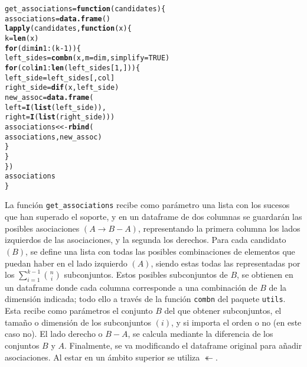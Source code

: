 \documentclass[12pt]{report}\usepackage[]{graphicx}\usepackage[dvipsnames]{xcolor}
\makeatletter
\newcommand{\hlnum}[1]{\textcolor[rgb]{0.686,0.059,0.569}{#1}}%
\newcommand{\hlopt}[1]{\textcolor[rgb]{0,0,0}{#1}}%
\newcommand{\hlstd}[1]{\textcolor[rgb]{0.345,0.345,0.345}{#1}}%
\newcommand{\hlkwa}[1]{\textcolor[rgb]{0.161,0.373,0.58}{\textbf{#1}}}%
\newcommand{\hlkwb}[1]{\textcolor[rgb]{0.69,0.353,0.396}{#1}}%
\newcommand{\hlkwc}[1]{\textcolor[rgb]{0.333,0.667,0.333}{#1}}%
\newcommand{\hlkwd}[1]{\textcolor[rgb]{0.737,0.353,0.396}{\textbf{#1}}}%
\newenvironment{kframe}{%
 \def\at@end@of@kframe{}%
 \ifinner\ifhmode%
  \def\at@end@of@kframe{\end{minipage}}%
  \begin{minipage}{\columnwidth}%
 \fi\fi%
 \def\FrameCommand##1{\hskip\@totalleftmargin \hskip-\fboxsep
 \colorbox{shadecolor}{##1}\hskip-\fboxsep
     \hskip-\linewidth \hskip-\@totalleftmargin \hskip\columnwidth}%
 \MakeFramed {\advance\hsize-\width
   \@totalleftmargin\z@ \linewidth\hsize
   \@setminipage}}%
 {\par\unskip\endMakeFramed%
 \at@end@of@kframe}
\newenvironment{knitrout}{}{} %
\makeatother
\begin{document}
\begin{knitrout}
\color{fgcolor}\begin{kframe}
\begin{alltt}
\hlstd{get_associations} \hlkwb{=} \hlkwa{function}\hlstd{(}\hlkwc{candidates}\hlstd{) \{}
        \hlstd{associations} \hlkwb{=} \hlkwd{data.frame}\hlstd{()}
        \hlkwd{lapply}\hlstd{(candidates,} \hlkwa{function}\hlstd{(}\hlkwc{x}\hlstd{) \{}
                \hlstd{k} \hlkwb{=} \hlkwd{len}\hlstd{(x)}
                \hlkwa{for} \hlstd{(dim} \hlkwa{in} \hlnum{1}\hlopt{:}\hlstd{(k} \hlopt{-} \hlnum{1}\hlstd{)) \{}
                        \hlstd{left_sides} \hlkwb{=} \hlkwd{combn}\hlstd{(x,} \hlkwc{m}\hlstd{=dim,} \hlkwc{simplify}\hlstd{=}\hlnum{TRUE}\hlstd{)}
                        \hlkwa{for} \hlstd{(col} \hlkwa{in} \hlnum{1}\hlopt{:}\hlkwd{len}\hlstd{(left_sides[}\hlnum{1}\hlstd{,])) \{}
                                \hlstd{left_side} \hlkwb{=} \hlstd{left_sides[, col]}
                                \hlstd{right_side} \hlkwb{=} \hlkwd{dif}\hlstd{(x, left_side)}
                                \hlstd{new_assoc} \hlkwb{=} \hlkwd{data.frame}\hlstd{(}
                                        \hlkwc{left} \hlstd{=} \hlkwd{I}\hlstd{(}\hlkwd{list}\hlstd{(left_side)),}
                                        \hlkwc{right} \hlstd{=} \hlkwd{I}\hlstd{(}\hlkwd{list}\hlstd{(right_side)))}
                                \hlstd{associations} \hlkwb{<<-} \hlkwd{rbind}\hlstd{(}
                                        \hlstd{associations, new_assoc)}
                        \hlstd{\}}
                \hlstd{\}}
        \hlstd{\})}
        \hlstd{associations}
\hlstd{\}}
\end{alltt}
\end{kframe}
\end{knitrout}
			
			La función \texttt{get\_associations} recibe como parámetro una lista con los sucesos que han superado el soporte, y en un dataframe de dos columnas se guardarán las posibles asociaciones $(A \rightarrow B - A)$, representando la primera columna los lados izquierdos de las asociaciones, y la segunda los derechos. Para cada candidato $(B)$, se define una lista con todas las posibles combinaciones de elementos que puedan haber en el lado izquierdo $(A)$, siendo estas todas las representadas por los $\sum_{i = 1}^{k-1}\binom{n}{i}$ subconjuntos. Estos posibles subconjuntos de $B$, se obtienen en un dataframe donde cada columna corresponde a una combinación de $B$ de la dimensión indicada; todo ello a través de la función \texttt{combn} del paquete \texttt{utils}. Esta recibe como parámetros el conjunto $B$ del que obtener subconjuntos, el tamaño o dimensión de los subconjuntos $(i)$, y si importa el orden o no (en este caso no). El lado derecho o $B - A$, se calcula mediante la diferencia de los conjuntos $B$ y $A$. Finalmente, se va modificando el dataframe original para añadir asociaciones. Al estar en un ámbito superior se utiliza $\twoheadleftarrow$. 
			
\end{document}
